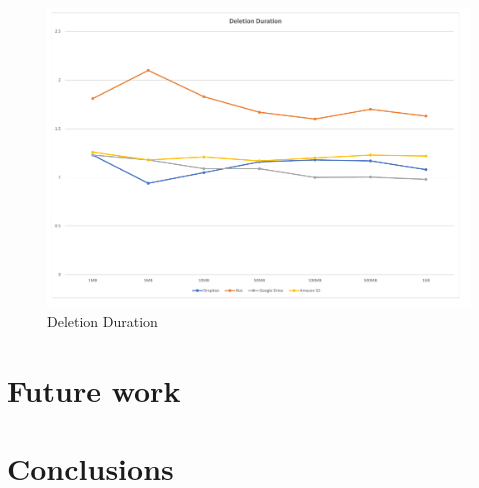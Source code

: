 \begin{figure} [!h]
	\centering
	\includegraphics[scale=0.5]{images/deletion_chart}
	\caption{\label{fig:deletion_duration}Deletion Duration}
\end{figure}

\section{Future work}

\section{Conclusions}
